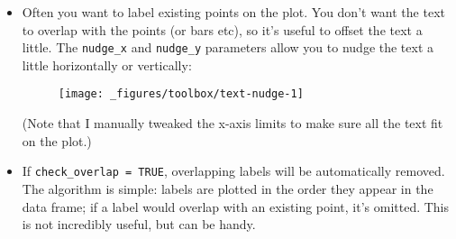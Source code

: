 \begin{itemize}
\item
  Often you want to label existing points on the plot. You don't want
  the text to overlap with the points (or bars etc), so it's useful to
  offset the text a little. The \texttt{nudge\_x} and \texttt{nudge\_y}
  parameters allow you to nudge the text a little horizontally or
  vertically:

\begin{Shaded}
\begin{Highlighting}[]
\StringTok{ }\NormalTok{(} \NormalTok{(}\NormalTok{, }\NormalTok{, }\NormalTok{), } \NormalTok{(}\NormalTok{, }\NormalTok{, }\NormalTok{))}
\OperatorTok{+}\StringTok{ }
\StringTok{  }\NormalTok{() }\OperatorTok{+}\StringTok{ }
\StringTok{  }\NormalTok{(}\NormalTok{(} \NormalTok{(}\NormalTok{)), } \NormalTok{) }\OperatorTok{+}\StringTok{ }
\StringTok{  }\NormalTok{(}\NormalTok{, }\NormalTok{)}
\end{Highlighting}
\end{Shaded}

  \begin{figure}[H]
    \texttt{[image: \_figures/toolbox/text-nudge-1]}
  \end{figure}

  (Note that I manually tweaked the x-axis limits to make sure all the
  text fit on the plot.)
\item
  If \texttt{check\_overlap\ =\ TRUE}, overlapping labels will be
  automatically removed. The algorithm is simple: labels are plotted in
  the order they appear in the data frame; if a label would overlap with
  an existing point, it's omitted. This is not incredibly useful, but
  can be handy. 

\begin{Shaded}
\begin{Highlighting}[]
\OperatorTok{+}\StringTok{ }
\StringTok{  }\NormalTok{(}\NormalTok{(}\OperatorTok{+}\StringTok{ }
\StringTok{  }\NormalTok{(}\NormalTok{, }\NormalTok{)}
\OperatorTok{+}\StringTok{ }
\StringTok{  }\NormalTok{(}\NormalTok{(} \NormalTok{) }\OperatorTok{+}\StringTok{ }
\StringTok{  }\NormalTok{(}\NormalTok{, }\NormalTok{)}
\end{Highlighting}
\end{Shaded}


\end{itemize}
